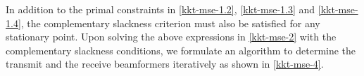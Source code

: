 In addition to the primal constraints in \eqref{kkt-mse-1.2}, \eqref{kkt-mse-1.3} and \eqref{kkt-mse-1.4}, the complementary slackness criterion must also be satisfied for any stationary point. Upon solving the above expressions in \eqref{kkt-mse-2} with the complementary slackness conditions, we formulate an algorithm to determine the transmit and the receive beamformers iteratively as shown in \eqref{kkt-mse-4}.
